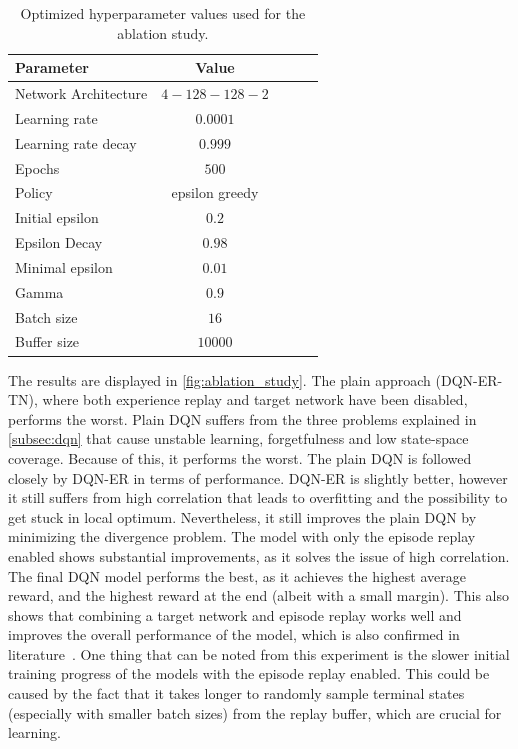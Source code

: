 \documentclass{article}
\begin{document}
\begin{table}[ht]
   \caption{Optimized hyperparameter values used for the ablation study.}
   \label{tbl:ablation_study_config}
   \vskip 0.15in
   \begin{center}
   \begin{small}
   \begin{sc}
   \begin{tabular}{lcccr}
   \toprule
   Parameter & Value \\
   \midrule
   Network Architecture    & $4-128-128-2$ \\
   Learning rate           & $0.0001$ \\
   Learning rate decay     & $0.999$   \\
   Epochs                  & $500$ \\
   Policy                  & epsilon greedy \\
   Initial epsilon         & $0.2$ \\
   Epsilon Decay           & $0.98$ \\
   Minimal epsilon         & $0.01$ \\
   Gamma                   & $0.9$ \\
   Batch size              & $16$ \\
   Buffer size             & $10000$ \\
   \bottomrule
   \end{tabular}
   \end{sc}
   \end{small}
   \end{center}
   \vskip -0.1in
\end{table}

The results are displayed in \autoref{fig:ablation_study}.
The plain approach (DQN-ER-TN), where both experience replay and target network have been disabled, performs the worst.
Plain DQN suffers from the three problems explained in \autoref{subsec:dqn} that cause unstable learning, forgetfulness and low state-space coverage.
Because of this, it performs the worst.
The plain DQN is followed closely by DQN-ER in terms of performance.
DQN-ER is slightly better, however it still suffers from high correlation that leads to overfitting and the possibility to get stuck in local optimum.
Nevertheless, it still improves the plain DQN by minimizing the divergence problem.
The model with only the episode replay enabled shows substantial improvements, as it solves the issue of high correlation.
The final DQN model performs the best, as it achieves the highest average reward, and the highest reward at the end
(albeit with a small margin).
This also shows that combining a target network and episode replay works well and improves
the overall performance of the model, which is also confirmed in literature~\cite{DBLP:books/sp/Plaat22}.
One thing that can be noted from this experiment is the slower initial training progress of the models with the episode
replay enabled.
This could be caused by the fact that it takes longer to randomly sample terminal states (especially with smaller batch sizes)
from the replay buffer, which are crucial for learning.
\end{document}
